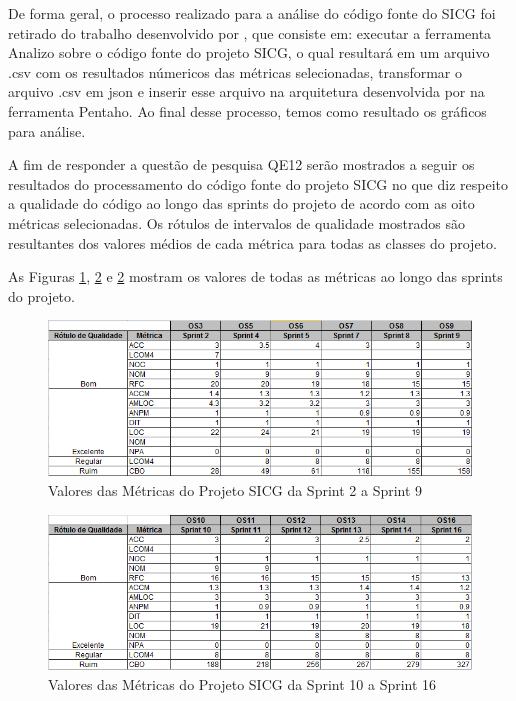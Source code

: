 De forma geral, o processo realizado para a análise do código fonte do SICG foi retirado do trabalho desenvolvido por , que  consiste em: executar a ferramenta Analizo sobre o código fonte do projeto SICG, o qual resultará em um arquivo .csv com os resultados númericos das métricas selecionadas, transformar o arquivo .csv em json e inserir esse arquivo na arquitetura desenvolvida por  na ferramenta Pentaho. Ao final desse processo, temos como resultado os gráficos para análise. 

A fim de responder a questão de pesquisa QE12 serão mostrados a seguir os resultados do processamento do código fonte do projeto SICG no que diz respeito a qualidade do código ao longo das sprints do projeto de acordo com as oito métricas selecionadas. Os rótulos de intervalos de qualidade mostrados são resultantes dos valores médios de cada métrica para todas as classes do projeto. 

As Figuras \ref{metricasprint}, \ref{metricasprint2} e \ref{metricasprint2} mostram os valores de todas as métricas ao longo das sprints do projeto.
\begin{figure}[H]
		\centering
			\includegraphics[scale=0.9]{figuras/metricas29.png}
		\caption{Valores das Métricas do Projeto SICG da Sprint 2 a Sprint 9}
		\label{metricasprint}
\end{figure}

\begin{figure}[H]
		\centering
			\includegraphics[scale=0.9]{figuras/metricas1016.png}
		\caption{Valores das Métricas do Projeto SICG da Sprint 10 a Sprint 16}
		\label{metricasprint2}
\end{figure}

